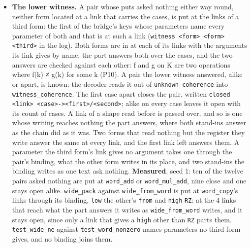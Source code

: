 \begin{itemize}
\item \textbf{The lower witness.} A pair whose puts asked nothing either way round, neither form located at a link that carries the cases, is put at the links of a third form: the first of the bridge's keys whose parameters name every parameter of both and that is at such a link (\texttt{witness <form> <form> <third>} in the log). Both forms are in at each of its links with the arguments its link gives by name, the part answers both over the cases, and the two answers are checked against each other: f and g on K are two operations where f(k) ≠ g(k) for some k (P10). A pair the lower witness answered, alike or apart, is known: the decoder reads it out of \texttt{unknown\_\allowbreak{}coherence} into \texttt{witness\_\allowbreak{}coherence}. The first case apart closes the pair, written \texttt{closed <link> <case>-\allowbreak{}><first>/\allowbreak{}<second>}; alike on every case leaves it open with its count of cases. A link of a shape read before is passed over, and so is one whose writing reaches nothing the part answers, where both stand-ins answer as the chain did as it was. Two forms that read nothing but the register they write answer the same at every link, and the first link left answers them. A parameter the third form's link gives no argument takes one through the pair's binding, what the other form writes in its place, and two stand-ins the binding writes as one text ask nothing. \textbf{Measured}, seed 1: ten of the twelve pairs asked nothing are put at \texttt{word\_\allowbreak{}add} or \texttt{word\_\allowbreak{}mul\_\allowbreak{}add}, nine close and one stays open alike. \texttt{wide\_\allowbreak{}pack} against \texttt{wide\_\allowbreak{}from\_\allowbreak{}word} is put at \texttt{word\_\allowbreak{}copy}'s links through its binding, \texttt{low} the other's \texttt{from} and \texttt{high} \texttt{RZ}: at the 4 links that reach what the part answers it writes as \texttt{wide\_\allowbreak{}from\_\allowbreak{}word} writes, and it stays open, since only a link that gives a \texttt{high} other than \texttt{RZ} parts them. \texttt{test\_\allowbreak{}wide\_\allowbreak{}ne} against \texttt{test\_\allowbreak{}word\_\allowbreak{}nonzero} names parameters no third form gives, and no binding joins them.

\end{itemize}
